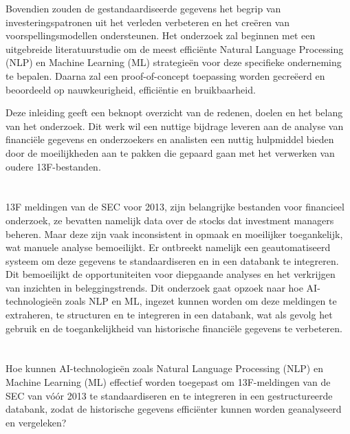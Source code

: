 Bovendien zouden de gestandaardiseerde gegevens het begrip van investeringspatronen uit het verleden verbeteren en het creëren van voorspellingsmodellen ondersteunen. Het onderzoek zal beginnen met een uitgebreide literatuurstudie om de meest efficiënte Natural Language Processing (NLP) en Machine Learning (ML) strategieën voor deze specifieke onderneming te bepalen. Daarna zal een proof-of-concept toepassing worden gecreëerd en beoordeeld op nauwkeurigheid, efficiëntie en bruikbaarheid.



Deze inleiding geeft een beknopt overzicht van de redenen, doelen en het belang van het onderzoek. Dit werk wil een nuttige bijdrage leveren aan de analyse van financiële gegevens en onderzoekers en analisten een nuttig hulpmiddel bieden door de moeilijkheden aan te pakken die gepaard gaan met het verwerken van oudere 13F-bestanden.

\section{}%
\label{sec:probleemstelling}

13F meldingen van de SEC voor 2013, zijn belangrijke bestanden voor financieel onderzoek, ze bevatten namelijk data over de stocks dat investment managers beheren. Maar deze zijn vaak inconsistent in opmaak en moeilijker toegankelijk, wat manuele analyse bemoeilijkt. Er ontbreekt namelijk een geautomatiseerd systeem om deze gegevens te standaardiseren en in een databank te integreren. Dit bemoeilijkt de opportuniteiten voor diepgaande analyses en het verkrijgen van inzichten in beleggingstrends. Dit onderzoek gaat opzoek naar hoe AI-technologieën zoals NLP en ML, ingezet kunnen worden om deze meldingen te extraheren, te structuren en te integreren in een databank, wat als gevolg het gebruik en de toegankelijkheid van historische financiële gegevens te verbeteren.


\section{}%
\label{sec:onderzoeksvraag}

Hoe kunnen AI-technologieën zoals Natural Language Processing (NLP) en Machine Learning (ML) effectief worden toegepast om 13F-meldingen van de SEC van vóór 2013 te standaardiseren en te integreren in een gestructureerde databank, zodat de historische gegevens efficiënter kunnen worden geanalyseerd en vergeleken?


